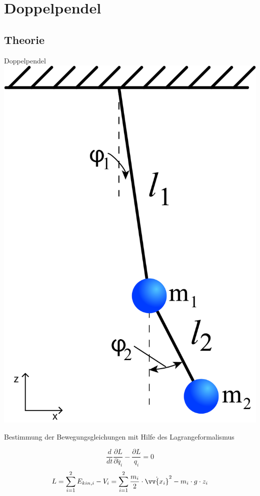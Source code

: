 \section{Doppelpendel}
\subsection{Theorie}
\begin{frame}{Doppelpendel}
	\centering
	\includegraphics[width=.4\textwidth]{images/4/double-pendulum}
\end{frame}

\begin{frame}{Bestimmung der Bewegungsgleichungen mit Hilfe des Lagrangeformalismus}
	\begin{block}
		
		\begin{equation}
			\frac{d}{dt}\frac{\partial L}{\partial\dot{q_i}}-\frac{\partial L}{q_i} =0
		\label{lagrangegl}
		\end{equation}
		\begin{equation}
			 L=\sum_{i=1}^2 E_{kin,i}-V_i=\sum_{i=1}^2 \frac{m_i}{2}\cdot\dot{\vv{x_i}}^2 - m_i \cdot g \cdot z_i
		\end{equation}
	\end{block}
\end{frame}

